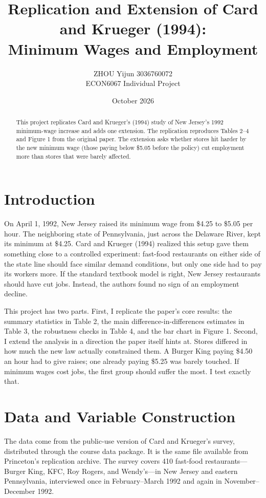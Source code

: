 \documentclass[11pt]{article}
\title{Replication and Extension of Card and Krueger (1994):\\
Minimum Wages and Employment}
\author{ZHOU Yijun 3036760072\\
ECON6067 Individual Project}
\date{October 2026}
\begin{document}
\maketitle

\begin{abstract}
\noindent This project replicates Card and Krueger's (1994) study of New Jersey's 1992 minimum-wage increase and adds one extension. The replication reproduces Tables 2--4 and Figure 1 from the original paper. The extension asks whether stores hit harder by the new minimum wage (those paying below \$5.05 before the policy) cut employment more than stores that were barely affected.
\end{abstract}

\section{Introduction}

On April 1, 1992, New Jersey raised its minimum wage from \$4.25 to \$5.05 per hour. The neighboring state of Pennsylvania, just across the Delaware River, kept its minimum at \$4.25. Card and Krueger (1994) realized this setup gave them something close to a controlled experiment: fast-food restaurants on either side of the state line should face similar demand conditions, but only one side had to pay its workers more. If the standard textbook model is right, New Jersey restaurants should have cut jobs. Instead, the authors found no sign of an employment decline.

This project has two parts. First, I replicate the paper's core results: the summary statistics in Table 2, the main difference-in-differences estimates in Table 3, the robustness checks in Table 4, and the bar chart in Figure 1. Second, I extend the analysis in a direction the paper itself hints at. Stores differed in how much the new law actually constrained them. A Burger King paying \$4.50 an hour had to give raises; one already paying \$5.25 was barely touched. If minimum wages cost jobs, the first group should suffer the most. I test exactly that.

\section{Data and Variable Construction}

The data come from the public-use version of Card and Krueger's survey, distributed through the course data package. It is the same file available from Princeton's replication archive. The survey covers 410 fast-food restaurants---Burger King, KFC, Roy Rogers, and Wendy's---in New Jersey and eastern Pennsylvania, interviewed once in February--March 1992 and again in November--December 1992.
\end{document}
